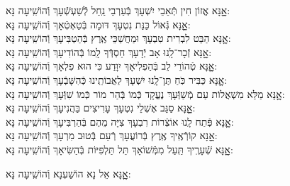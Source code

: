 \documentclass[twoside, openany, parskip=half, 11pt]{book}
\begin{document}
\begin{small}
אׇׇָנָּא אֱזוֹן חִין תְּֿאֵבֵי יִשְׁעָךְ בְּֿעַרְבֵי נַֽחַל לְֿשַׁעְשְֿׁעָךְ \hfill וְֿהוֹשִֽׁיעָה נָּא:\\
אׇׇָנָּא גְּֿאוֹל כַּנַּת נִטְעָךְ דּוּמָה בְּֿטַאְטְֿאָךְ \hfill וְֿהוֹשִֽׁיעָה נָּא:\\
אׇׇָנָּא הַבֵּט לִבְרִית טִבְעָךְ וּמַחֲשַׁכֵּי אֶֽרֶץ בְּֿהַטְבִּיעָךְ \hfill וְֿהוֹשִֽׁיעָה נָּא:\\
אׇׇָנָּא זְֿכָר־לָֽנוּ אָב יְֿדָעָךְ חַסְדְּֿךָ לָֽמוֹ בְּֿהוֹדִיעָךְ \hfill וְֿהוֹשִֽׁיעָה נָּא:\\
אׇׇָנָּא טְֿהוֹרֵי לֵב בְּֿהַפְלִיאָךְ יִוָּדַע כִּי הוּא פִלְאָךְ \hfill וְֿהוֹשִֽׁיעָה נָּא:\\
אׇׇָנָּא כַּבִּיר כֹּֽחַ תֶּן־לָֽנוּ יִשְׁעָךְ לַאֲבוֹתֵֽינוּ כְּֿהִשָּׁבְֿעָךְ \hfill וְֿהוֹשִֽׁיעָה נָּא:\\
אׇׇָנָּא מַלֵּא מִשְׁאֲלוֹת עַם מְֿשַׁוְּֿעָךְ נֶעֱקָד כְּֿמוֹ בְּֿהַר מוֹר כְּֿמוֹ שִׁוְּֿעָךְ \hfill וְֿהוֹשִֽׁיעָה נָּא:\\
אׇׇָנָּא סַגֵּב אֶשְׁלֵי נִטְעָךְ עָרִיצִים בַּהֲנִיעָךְ \hfill וְֿהוֹשִֽׁיעָה נָּא:\\
אׇׇָנָּא פְּֿתַח לָֽנוּ אוֹצְֿרוֹת רִבְעָךְ צִיָּה מֵהֶם בְּֿהַרְבִּיעָךְ \hfill וְֿהוֹשִֽׁיעָה נָּא:\\
אׇׇָנָּא קוֹרְֿאֶֽיךָ אֶֽרֶץ בְּֿרוֹעֲעָךְ רְֿעֵם בְּֿטוּב מִרְעָךְ \hfill וְֿהוֹשִֽׁיעָה נָּא:\\
אׇׇָנָּא שְֿׁעָרֶֽיךָ תַּֽעַל מִמְּֿשׁוֹאָךְ תֵּל תַּלְפִּיּוֹת בְּֿהַשִּׂיאָךְ \hfill וְֿהוֹשִֽׁיעָה נָּא:

\end{small}

\begin{large}
\shatzvkahal
אׇׇָנָּא אֵל נָא הוֹשַׁעְנָא וְֿהוֹשִֽׁיעָה נָּא:

\end{large}
\end{document}
